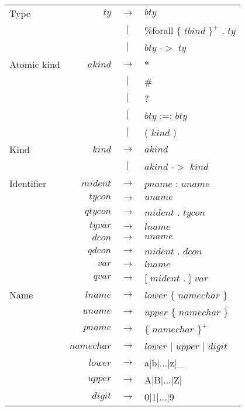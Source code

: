 \documentclass{article}
\begin{document}
\begin{small}
\begin{longtable}{ l r c l }
Type		&
$ty$		& $ \rightarrow $	& $bty$											\\
		&
		& $ | $			& \%forall $\{$ $tbind$ $\}^{+}$ . $ty$							\\
		& 
		& $ | $			& $bty$ -$>$ $ty$									\\

Atomic kind	&
$akind$		& $ \rightarrow $	& $*$											\\
		&
		& $ | $			& \#											\\
		&
		& $ | $			& ?											\\
		&
		& $ | $			& $bty$ :=: $bty$									\\
		&
		& $ | $			& ( $kind$ ) 										\\

Kind		&
$kind$		& $ \rightarrow $	& $akind$										\\
		&
		& $ | $			& $akind$ -$>$ $kind$									\\

Identifier	&
$mident$	& $ \rightarrow $	& $pname$ : $uname$									\\
		&
$tycon$		& $ \rightarrow $	& $uname$										\\
		&
$qtycon$	& $ \rightarrow $	& $mident$ . $tycon$									\\
		&
$tyvar$		& $ \rightarrow $	& $lname$										\\
		&
$dcon$		& $ \rightarrow $	& $uname$										\\
		&
$qdcon$		& $ \rightarrow $	& $mident$ . $dcon$									\\
		&
$var$		& $ \rightarrow $	& $lname$										\\
		&
$qvar$		& $ \rightarrow $	& $[$ $mident$ . $]$ $var$								\\

Name		&
$lname$		& $ \rightarrow $	& $lower$ $\{$ $namechar$ $\}$								\\
		&
$uname$		& $ \rightarrow $	& $upper$ $\{$ $namechar$ $\}$								\\
		&
$pname$		& $ \rightarrow $	& $\{$ $namechar$ $\}^{+}$								\\
		&
$namechar$	& $ \rightarrow $	& $lower$ $|$ $upper$ $|$ $digit$							\\
		&
$lower$		& $ \rightarrow $	& a$|$b$|$...$|$z$|$\_									\\
		&
$upper$		& $ \rightarrow $	& A$|$B$|$...$|$Z$|$										\\
		&
$digit$		& $ \rightarrow $	& 0$|$1$|$...$|$9										\\

\end{longtable}
\end{small}
\end{document}
